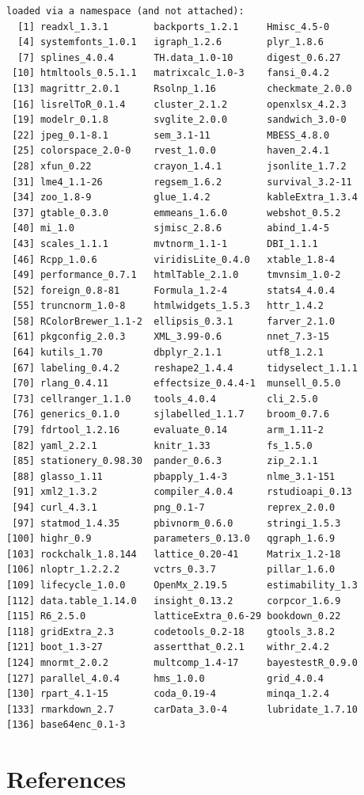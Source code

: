 \documentclass[
  english,
]{book}
\begin{document}
\begin{verbatim}
loaded via a namespace (and not attached):
  [1] readxl_1.3.1        backports_1.2.1     Hmisc_4.5-0        
  [4] systemfonts_1.0.1   igraph_1.2.6        plyr_1.8.6         
  [7] splines_4.0.4       TH.data_1.0-10      digest_0.6.27      
 [10] htmltools_0.5.1.1   matrixcalc_1.0-3    fansi_0.4.2        
 [13] magrittr_2.0.1      Rsolnp_1.16         checkmate_2.0.0    
 [16] lisrelToR_0.1.4     cluster_2.1.2       openxlsx_4.2.3     
 [19] modelr_0.1.8        svglite_2.0.0       sandwich_3.0-0     
 [22] jpeg_0.1-8.1        sem_3.1-11          MBESS_4.8.0        
 [25] colorspace_2.0-0    rvest_1.0.0         haven_2.4.1        
 [28] xfun_0.22           crayon_1.4.1        jsonlite_1.7.2     
 [31] lme4_1.1-26         regsem_1.6.2        survival_3.2-11    
 [34] zoo_1.8-9           glue_1.4.2          kableExtra_1.3.4   
 [37] gtable_0.3.0        emmeans_1.6.0       webshot_0.5.2      
 [40] mi_1.0              sjmisc_2.8.6        abind_1.4-5        
 [43] scales_1.1.1        mvtnorm_1.1-1       DBI_1.1.1          
 [46] Rcpp_1.0.6          viridisLite_0.4.0   xtable_1.8-4       
 [49] performance_0.7.1   htmlTable_2.1.0     tmvnsim_1.0-2      
 [52] foreign_0.8-81      Formula_1.2-4       stats4_4.0.4       
 [55] truncnorm_1.0-8     htmlwidgets_1.5.3   httr_1.4.2         
 [58] RColorBrewer_1.1-2  ellipsis_0.3.1      farver_2.1.0       
 [61] pkgconfig_2.0.3     XML_3.99-0.6        nnet_7.3-15        
 [64] kutils_1.70         dbplyr_2.1.1        utf8_1.2.1         
 [67] labeling_0.4.2      reshape2_1.4.4      tidyselect_1.1.1   
 [70] rlang_0.4.11        effectsize_0.4.4-1  munsell_0.5.0      
 [73] cellranger_1.1.0    tools_4.0.4         cli_2.5.0          
 [76] generics_0.1.0      sjlabelled_1.1.7    broom_0.7.6        
 [79] fdrtool_1.2.16      evaluate_0.14       arm_1.11-2         
 [82] yaml_2.2.1          knitr_1.33          fs_1.5.0           
 [85] stationery_0.98.30  pander_0.6.3        zip_2.1.1          
 [88] glasso_1.11         pbapply_1.4-3       nlme_3.1-151       
 [91] xml2_1.3.2          compiler_4.0.4      rstudioapi_0.13    
 [94] curl_4.3.1          png_0.1-7           reprex_2.0.0       
 [97] statmod_1.4.35      pbivnorm_0.6.0      stringi_1.5.3      
[100] highr_0.9           parameters_0.13.0   qgraph_1.6.9       
[103] rockchalk_1.8.144   lattice_0.20-41     Matrix_1.2-18      
[106] nloptr_1.2.2.2      vctrs_0.3.7         pillar_1.6.0       
[109] lifecycle_1.0.0     OpenMx_2.19.5       estimability_1.3   
[112] data.table_1.14.0   insight_0.13.2      corpcor_1.6.9      
[115] R6_2.5.0            latticeExtra_0.6-29 bookdown_0.22      
[118] gridExtra_2.3       codetools_0.2-18    gtools_3.8.2       
[121] boot_1.3-27         assertthat_0.2.1    withr_2.4.2        
[124] mnormt_2.0.2        multcomp_1.4-17     bayestestR_0.9.0   
[127] parallel_4.0.4      hms_1.0.0           grid_4.0.4         
[130] rpart_4.1-15        coda_0.19-4         minqa_1.2.4        
[133] rmarkdown_2.7       carData_3.0-4       lubridate_1.7.10   
[136] base64enc_0.1-3    
\end{verbatim}

\hypertarget{refs}{%
\chapter*{References}\label{refs}}

  
\end{document}

